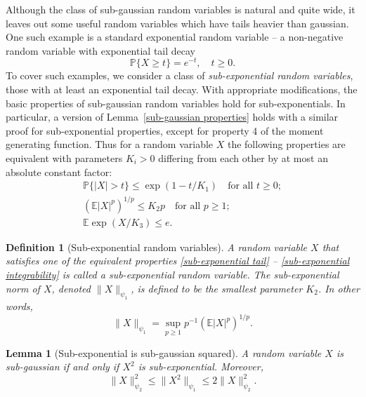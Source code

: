 \documentclass[10pt, openany]{book}
\newtheorem{lemma}[theorem]{Lemma}
\newtheorem{definition}[theorem]{Definition}
\theoremstyle{remark}
\def \E {\mathbb{E}}
\def \P {\mathbb{P}}
\def \psione {{\psi_1}}
\def \psitwo {{\psi_2}}
\begin{document}
Although the class of sub-gaussian random variables is natural and quite wide, 
it leaves out some useful random variables which have tails heavier than gaussian.
One such example is a standard exponential random variable
-- a non-negative random variable with exponential tail decay 
\begin{equation}							\label{exponential}
\P\{X \ge t\} = e^{-t}, \quad t \ge 0.
\end{equation}
To cover such examples, we consider a class of {\em sub-exponential random variables},
those with at least an exponential tail decay. With appropriate 
modifications, the basic properties of sub-gaussian random variables hold
for sub-exponentials. 
In particular, a version of Lemma~\ref{sub-gaussian properties} holds with a similar proof 
for sub-exponential properties, except for property 4 of the moment generating function. 
Thus for a random variable $X$ the following properties are equivalent with parameters 
$K_i > 0$ differing from each other by at most an absolute constant factor:
\begin{gather}
\P \{ |X| > t \} \le \exp(1-t/K_1) \quad \text{for all } t \ge 0;  	\label{sub-exponential tail} \\
(\E |X|^p)^{1/p} \le K_2 p \quad \text{for all } p \ge 1; 		\label{sub-exponential moments} \\
\E \exp(X/K_3) \le e.									\label{sub-exponential integrability}
\end{gather} 

\begin{definition}[Sub-exponential random variables]  
  A random variable $X$ that satisfies one of the equivalent properties 
  \eqref{sub-exponential tail} -- \eqref{sub-exponential integrability}
  is called a {\em sub-exponential random variable}.
  The {\em sub-exponential norm}  of $X$, denoted $\|X\|_\psione$, 
  is defined to be the smallest parameter $K_2$.
  In other words,
  $$
  \|X\|_\psione = \sup_{p \ge 1} p^{-1} (\E |X|^p)^{1/p}.
  $$ 
\end{definition}

\begin{lemma}[Sub-exponential is sub-gaussian squared]				\label{sub-exponential squared}
  A random variable $X$ is sub-gaussian if and only if $X^2$ is sub-exponential.
  Moreover,
  $$
  \|X\|_\psitwo^2 \le \|X^2\|_\psione \le 2 \|X\|_\psitwo^2. 
  $$
\end{lemma}
\end{document}

